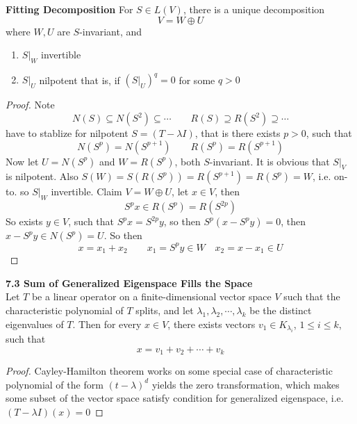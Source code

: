 \documentclass[11pt]{article}
\begin{document}
\begin{lemma*}
    \textbf{Fitting Decomposition} For $S\in L(V)$, there is a unique decomposition 
    \[
        V = W \oplus U    
    \]
    where $W,U$ are $S$-invariant, and 
    \begin{enumerate}
        \item $S|_W$ invertible 
        \item $S|_U$ nilpotent that is, if $(S|_U)^q = 0$ for some $q > 0$
    \end{enumerate}
    \begin{proof}
        Note 
        \[
            N(S) \subseteq N(S^2) \subseteq \cdots 
            \qquad 
            R(S) \supseteq R(S^2) \supseteq \cdots
        \]
        have to stablize for nilpotent $S = (T-\lambda I)$, that is there exists $p>0$, such that 
        \[
            N(S^p) = N(S^{p+1})
            \qquad 
            R(S^p) = R(S^{p+1})
        \]
        Now let $U = N(S^p)$ and $W = R(S^p)$, both $S$-invariant. It is obvious that $S|_V$ is nilpotent. Also $S(W) = S(R(S^p)) = R(S^{p+1}) = R(S^p) = W$, i.e. on-to. so $S|_W$ invertible. Claim $V = W\oplus U$, let $x\in V$, then 
        \[
            S^px \in R(S^p) = R(S^{2p})
        \]
        So exists $y\in V$, such that $S^px = S^{2p}y$, so then $S^p(x - S^py) = 0$, then $x - S^p y \in N(S^p) = U$. So then
        \[
            x = x_1 + x_2 
            \qquad 
            x_1 = S^p y \in W
            \quad
            x_2 = x - x_1 \in U
        \]

    \end{proof}
\end{lemma*}
 

\begin{theorem*}
    \textbf{7.3 Sum of Generalized Eigenspace Fills the Space} \\
    Let $T$ be a linear operator on a finite-dimensional vector space $V$ such that the characteristic polynomial of $T$ splits, and let $\lambda_1,\lambda_2,\cdots, \lambda_k$ be the distinct eigenvalues of $T$. Then for every $x\in V$, there exists vectors $v_1\in K_{\lambda_i}$, $1\leq i \leq k$, such that 
    \[ 
        x = v_1 + v_2 + \cdots + v_k    
    \]
    \begin{proof}
        Cayley-Hamilton theorem works on some special case of characteristic polynomial of the form $(t-\lambda)^d$ yields the zero transformation, which makes some subset of the vector space satisfy condition for generalized eigenspace, i.e. $(T-\lambda I)(x) = 0$
    \end{proof}
\end{theorem*}
\end{document}
